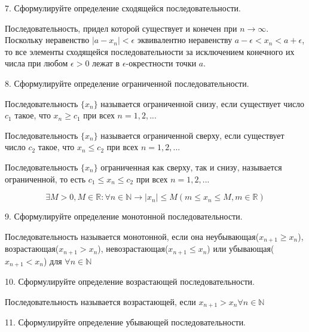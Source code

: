 \documentclass[a4paper, 10pt]{article}
\begin{document}
    \begin{bf}7. Сформулируйте определение сходящейся последовательности.\end{bf}

    Последовательность, придел которой существует и конечен при $n \to \infty$. Поскольку 
    неравенство $|a - x_n| < \epsilon$ эквивалентно неравенству 
    $a - \epsilon < x_n < a + \epsilon$, то все элементы сходящейся последовательности 
    за исключением конечного их числа при любом $\epsilon > 0$ лежат в $\epsilon$-окрестности 
    точки $a$.

    \begin{bf}8. Сформулируйте определение ограниченной последовательности.\end{bf}

    Последовательность $\{x_n\}$ называется ограниченной снизу, если существует число $c_1$
    такое, что $x_n  \geqslant  c_1$ при всех $n = 1, 2, ...$

    Последовательность $\{x_n\}$ называется ограниченной сверху, если существует число $c_2$
    такое, что $x_n  \leqslant  c_2$ при всех $n = 1, 2, ...$

    Последовательность $\{x_n\}$ ограниченная как сверху, так и снизу, называется ограниченной,
    то есть $c_1  \leqslant  x_n  \leqslant  c_2$ при всех $n = 1, 2, ...$

    $$\exists M > 0, M \in \mathbb{R}: \forall n \in \mathbb{N} \longrightarrow |x_n|  \leqslant  M 
    (m  \leqslant  x_n  \leqslant  M, m \in \mathbb{R})$$

    \begin{bf}9. Сформулируйте определение монотонной последовательности.\end{bf}
    
    Последовательность называется монотонной, если она неубывающая($x_{n+1} \geqslant x_n$), возрастающая($x_{n+1}>x_n$), 
    невозрастающая($x_{n+1} \leqslant x_n$) или убывающая($x_{n+1}<x_n$) для $\forall n \in \mathbb{N}$

    \begin{bf}10. Сформулируйте определение возрастающей последовательности.\end{bf}

    Последовательность называется возрастающей, если $x_{n+1} > x_n \forall n \in \mathbb{N}$
        
    \begin{bf}11. Сформулируйте определение убывающей последовательности.\end{bf}
\end{document}
